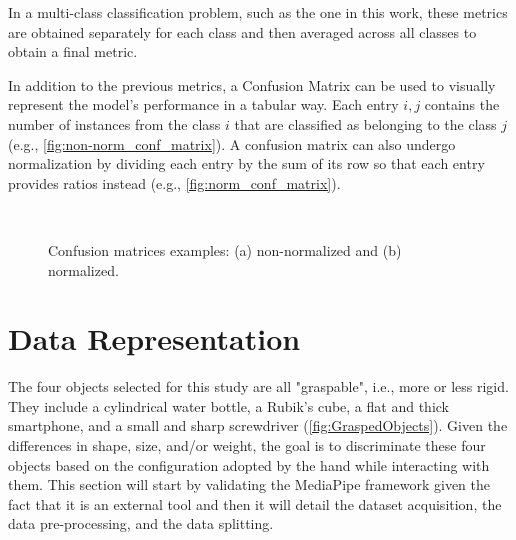 In a multi-class classification problem, such as the one in this work, these metrics are obtained separately for each class and then averaged across all classes to obtain a final metric.

In addition to the previous metrics, a Confusion Matrix can be used to visually represent the model's performance in a tabular way. Each entry $i,j$ contains the number of instances from the class $i$ that are classified as belonging to the class $j$ (e.g., \autoref{fig:non-norm_conf_matrix}). A confusion matrix can also undergo normalization by dividing each entry by the sum of its row so that each entry provides ratios instead (e.g., \autoref{fig:norm_conf_matrix}).

\begin{figure}[ht]
    \centering
    \begin{subfigure}[b]{0.35\textwidth}
        {\fontsize{10}{12}\selectfont}
        \caption{}
        \label{fig:non-norm_conf_matrix}
    \end{subfigure} \ \
    \begin{subfigure}[b]{0.35\textwidth}
        {\fontsize{10}{12}\selectfont}
        \caption{}
        \label{fig:norm_conf_matrix}
    \end{subfigure}
    \caption[Confusion matrices examples: non-normalized and normalized.]{Confusion matrices examples: (a) non-normalized and (b) normalized.}
    \label{fig:conf_matrix_examples}
\end{figure}

\section{Data Representation}
\label{section:data_representation}

The four objects selected for this study are all "graspable", i.e., more or less rigid. They include a cylindrical water bottle, a Rubik’s cube, a flat and thick smartphone, and a small and sharp screwdriver (\autoref{fig:GraspedObjects}). Given the differences in shape, size, and/or weight, the goal is to discriminate these four objects based on the configuration adopted by the hand while interacting with them. This section will start by validating the MediaPipe framework given the fact that it is an external tool and then it will detail the dataset acquisition, the data pre-processing, and the data splitting. 

